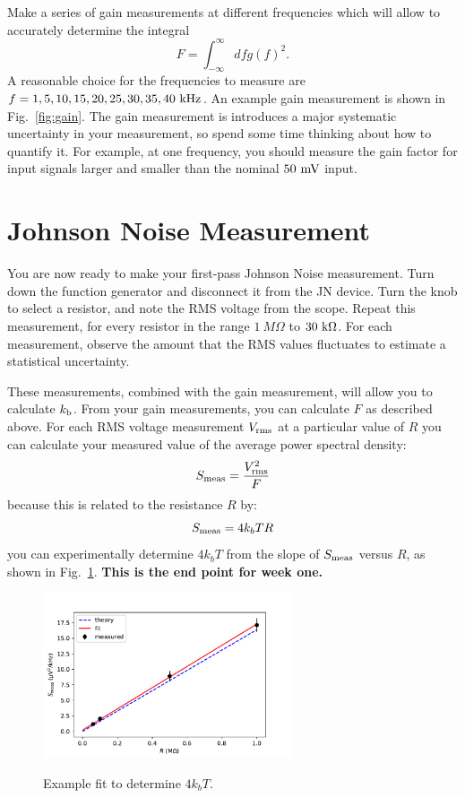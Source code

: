 \documentclass[12pt]{article}
\newcommand{\kb}{k_{\rm b}}
\begin{document}
Make a series of gain measurements at different frequencies which will allow to accurately determine the integral
\begin{displaymath}
F = \int_{-\infty}^{\infty} df g(f)^2.
\end{displaymath}
A reasonable choice for the frequencies to measure are $f=1,5,10,15,20,25,30,35,40~\rm kHz$.  An example gain measurement is shown in Fig.~\ref{fig:gain}.  The gain measurement is introduces a major systematic uncertainty in your measurement, so spend some time thinking about how to quantify it.  For example, at one frequency, you should measure the gain factor for input signals larger and smaller than the nominal $50~\rm mV$ input.  

\section{Johnson Noise Measurement}

You are now ready to make your first-pass Johnson Noise measurement.  Turn down the function generator and disconnect it from the JN device.  Turn the knob to select a resistor, and note the RMS voltage from the scope.  Repeat this measurement, for every resistor in the range $1~M\Omega$ to $30~\rm k\Omega$.  For each measurement, observe the amount that the RMS values fluctuates to estimate a statistical uncertainty.

These measurements, combined with the gain measurement, will allow you to calculate $\kb$.
From your gain measurements, you can calculate $F$ as described above.  For each RMS voltage measurement $V_{\rm rms}$ at a particular value of $R$ you can calculate your measured value of the average power spectral density:
\begin{displaymath}
S_{\rm meas} = \frac{V^2_{\rm rms}}{F} 
\end{displaymath}
because this is related to the resistance $R$ by:
\begin{displaymath}
S_{\rm meas} = 4 k _bT R 
\end{displaymath}
you can experimentally determine $4 k_b T$ from the slope of $S_{\rm meas}$ versus $R$, as shown in Fig.~\ref{fig:fit}.  {\bf This is the end point for week one.}  

\begin{figure}[htbp]
\begin{center}
{\includegraphics[width=0.65\textwidth]{figs/fit_4.pdf}}
\end{center}
\caption{\label{fig:fit}  Example fit to determine $4 k_b T$.}
\end{figure}
\end{document}
